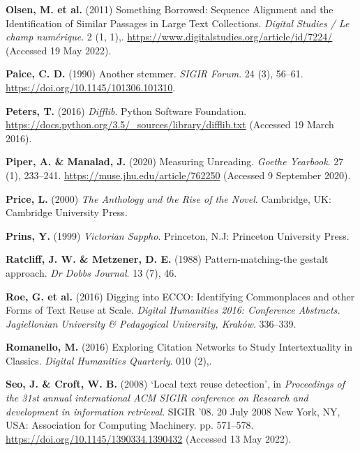 \documentclass[
]{article}
\newlength{\cslhangindent}
\newlength{\cslentryspacingunit} %
\newenvironment{CSLReferences}[2] %
 {%
  \setlength{\parindent}{0pt}
  \ifodd #1
  \let\oldpar\par
  \def\par{\hangindent=\cslhangindent\oldpar}
  \fi
  \setlength{\parskip}{#2\cslentryspacingunit}
 }%
 {}
\begin{document}
\begin{CSLReferences}{1}{0}
\leavevmode{}%
\textbf{Olsen, M. et al.} (2011) Something {Borrowed}: {Sequence
Alignment} and the {Identification} of {Similar Passages} in {Large Text
Collections}. \emph{Digital Studies / Le champ numérique}. 2 (1, 1),.
\url{https://www.digitalstudies.org/article/id/7224/} (Accessed 19 May
2022).

\leavevmode{}%
\textbf{Paice, C. D.} (1990) Another stemmer. \emph{SIGIR Forum}. 24
(3), 56--61. \url{https://doi.org/10.1145/101306.101310}.

\leavevmode{}%
\textbf{Peters, T.} (2016) \emph{Difflib}. {Python Software Foundation}.
\url{https://docs.python.org/3.5/_sources/library/difflib.txt} (Accessed
19 March 2016).

\leavevmode{}%
\textbf{Piper, A. \& Manalad, J.} (2020) Measuring {Unreading}.
\emph{Goethe Yearbook}. 27 (1), 233--241.
\url{https://muse.jhu.edu/article/762250} (Accessed 9 September 2020).

\leavevmode{}%
\textbf{Price, L.} (2000) \emph{The {Anthology} and the {Rise} of the
{Novel}}. {Cambridge, UK}: {Cambridge University Press}.

\leavevmode{}%
\textbf{Prins, Y.} (1999) \emph{Victorian {Sappho}}. {Princeton, N.J}:
{Princeton University Press}.

\leavevmode{}%
\textbf{Ratcliff, J. W. \& Metzener, D. E.} (1988) Pattern-matching-the
gestalt approach. \emph{Dr Dobbs Journal}. 13 (7), 46.

\leavevmode{}%
\textbf{Roe, G. et al.} (2016) Digging into {ECCO}: {Identifying
Commonplaces} and other {Forms} of {Text Reuse} at {Scale}.
\emph{Digital Humanities 2016: Conference Abstracts. Jagiellonian
University \& Pedagogical University, Kraków}. 336--339.

\leavevmode{}%
\textbf{Romanello, M.} (2016) Exploring {Citation Networks} to {Study
Intertextuality} in {Classics}. \emph{Digital Humanities Quarterly}. 010
(2),.

\leavevmode{}%
\textbf{Seo, J. \& Croft, W. B.} (2008) {`Local text reuse detection'},
in \emph{Proceedings of the 31st annual international {ACM SIGIR}
conference on {Research} and development in information retrieval}.
{SIGIR} '08. 20 July 2008 {New York, NY, USA}: {Association for
Computing Machinery}. pp. 571--578.
\url{https://doi.org/10.1145/1390334.1390432} (Accessed 13 May 2022).


\end{CSLReferences}
\end{document}
